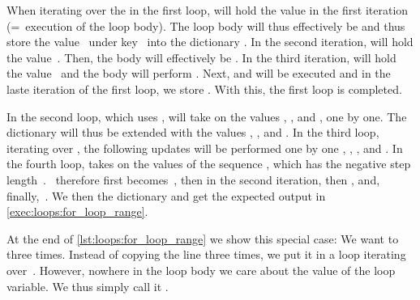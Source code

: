 When iterating over the  in the first loop,  will hold the value  in the first iteration (=~execution of the loop body).
The loop body  will thus effectively be  and thus store the value~ under key~ into the dictionary .
In the second iteration,  will hold the value~.
Then, the body  will effectively be .
In the third iteration,  will hold the value~ and the body will perform .
Next,  and  will be executed and in the laste iteration of the first loop, we store .
With this, the first loop is completed.%
%
\begin{sloppypar}%
In the second loop, which uses ,  will take on the values , , and , one by one.
The dictionary  will thus be extended with the values , , and .
In the third loop, iterating over , the following updates will be performed one by one , , , and .
In the fourth loop,  takes on the values of the sequence , which has the negative step length~.
~therefore first becomes~, then  in the second iteration, then , and, finally,~.
We then  the dictionary and get the expected output in \cref{exec:loops:for_loop_range}.%
\end{sloppypar}%
%
%
%
At the end of \cref{lst:loops:for_loop_range} we show this special case:
We want to   three times.
Instead of copying the line  three times, we put it in a loop iterating over~.
However, nowhere in the loop body we care about the value of the loop variable.
We thus simply call it \pythonil{_}\pythonIdx{\_}.

